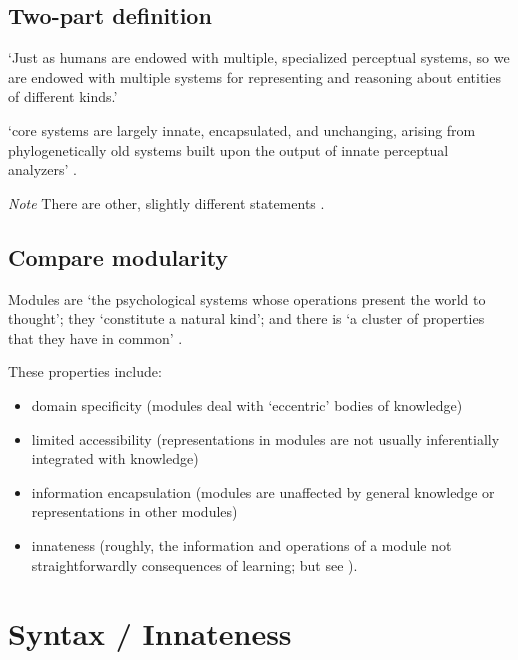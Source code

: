 \documentclass[12pt]{extarticle}
\begin{document}
\begin{multicols}{3}
\subsection{Two-part definition}
 
‘Just as humans are endowed with multiple, specialized perceptual systems, so we are endowed with multiple systems for representing and reasoning about entities of different kinds.’
\citep[p.\ 517]{Carey:1996hl}
 
‘core systems are
largely innate,
encapsulated, and
unchanging,
arising from phylogenetically old systems
built upon the output of innate perceptual analyzers’
\citep[p.\ 520]{Carey:1996hl}.
 
\textit{Note} There are other, slightly different statements \citep[e.g.][]{carey:2009_origin}.
 
\subsection{Compare modularity}
 
Modules are ‘the psychological systems whose operations present the world to thought’; they ‘constitute a natural kind’; and there is ‘a cluster of properties that they have in common’ \citep[p.\ 101]{Fodor:1983dg}.
 
These properties include:
 
\begin{itemize}
 
\item domain specificity (modules deal with ‘eccentric’ bodies of knowledge)
 
\item limited accessibility (representations in modules are not usually inferentially integrated with knowledge)
 
\item information encapsulation (modules are unaffected by general knowledge or representations in other modules)
 
\item innateness (roughly, the information and operations of a module not straightforwardly consequences of learning; but see \citet{Samuels:2004ho}).
 
\end{itemize}
 
 
 
\section{Syntax / Innateness}
 

\end{multicols}
\end{document}
